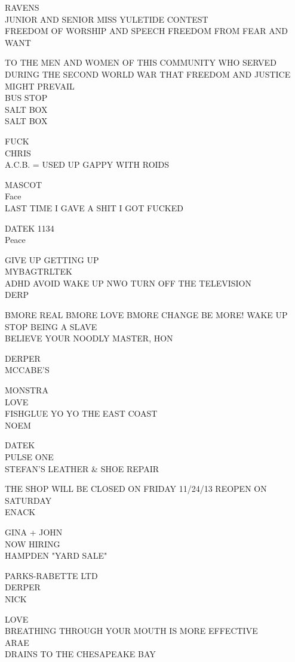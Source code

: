 \documentclass[10pt,letterpaper]{article}
\begin{document}
RAVENS\\
JUNIOR AND SENIOR MISS YULETIDE CONTEST\\
FREEDOM OF WORSHIP AND SPEECH FREEDOM FROM FEAR AND WANT

TO THE MEN AND WOMEN OF THIS COMMUNITY WHO SERVED DURING THE SECOND WORLD WAR THAT FREEDOM AND JUSTICE MIGHT PREVAIL\\
BUS STOP\\
SALT BOX\\
SALT BOX

FUCK\\
CHRIS\\
A.C.B. = USED UP GAPPY WITH ROIDS

MASCOT\\
Face\\
LAST TIME I GAVE A SHIT I GOT FUCKED

DATEK 1134\\
Peace

GIVE UP GETTING UP\\
MYBAGTRLTEK\\
ADHD AVOID WAKE UP NWO TURN OFF THE TELEVISION\\
DERP

BMORE REAL BMORE LOVE BMORE CHANGE BE MORE! WAKE UP\\
STOP BEING A SLAVE\\
BELIEVE YOUR NOODLY MASTER, HON

DERPER\\
MCCABE'S

MONSTRA\\
LOVE\\
FISHGLUE YO YO THE EAST COAST\\
NOEM

DATEK\\
PULSE ONE\\
STEFAN'S LEATHER \& SHOE REPAIR

THE SHOP WILL BE CLOSED ON FRIDAY 11/24/13 REOPEN ON SATURDAY\\
ENACK

GINA + JOHN\\
NOW HIRING\\
HAMPDEN "YARD SALE"

PARKS{-}RABETTE LTD\\
DERPER\\
NICK

LOVE\\
BREATHING THROUGH YOUR MOUTH IS MORE EFFECTIVE\\
ARAE\\
DRAINS TO THE CHESAPEAKE BAY
\end{document}
